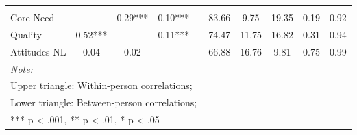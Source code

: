 \begin{table}
\begin{minipage}[t][\textheight][t]{\textwidth}
{\begin{tabular}[t]{lccccccccc}
\addlinespace[0.3em]
\multicolumn{10}{l}{\textbf{Across Studies}}\\
\hspace{1em}Core Need &  & 0.29*** & 0.10*** &  & 83.66 & 9.75 & 19.35 & 0.19 & 0.92\\
\hspace{1em}Quality & 0.52*** &  & 0.11*** &  & 74.47 & 11.75 & 16.82 & 0.31 & 0.94\\
\hspace{1em}Attitudes NL & 0.04 & 0.02 &  &  & 66.88 & 16.76 & 9.81 & 0.75 & 0.99\\
\bottomrule
\multicolumn{10}{l}{\rule{0pt}{1em}\textit{Note: }}\\
\multicolumn{10}{l}{\rule{0pt}{1em}Upper triangle: Within-person correlations;}\\
\multicolumn{10}{l}{\rule{0pt}{1em}Lower triangle: Between-person correlations;}\\
\multicolumn{10}{l}{\rule{0pt}{1em}*** p < .001, ** p < .01,  * p < .05}\\
\end{tabular}}
\end{minipage}
\end{table}
